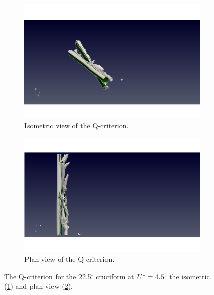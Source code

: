 \documentclass[oneside]{utmthesis}
\begin{document}
\begin{figure}[H]
  \centering
  \begin{subfigure}[h]{0.48\textwidth}
    \includegraphics[width=\textwidth,trim={1.5cm 0 3cm 0},clip]{figs/qIso225U02}
    \caption{Isometric view of the Q-criterion.}
    \label{fig:qIso225U02}
  \end{subfigure}
  \hfill
  \begin{subfigure}[h]{0.48\textwidth}
    \includegraphics[width=\textwidth,trim={1.5cm 0 3cm 0},clip]{figs/qTop225U02}
    \caption{Plan view of the Q-criterion.}
    \label{fig:qTop225U02}
  \end{subfigure}

  \caption{The Q-criterion for the 22.5$^{\circ}$ cruciform at $U^{*} = 4.5$: the isometric (\ref{fig:qIso225U02}) and plan view (\ref{fig:qTop225U02}).} \label{fig:qCrit225U02}
\end{figure}
\end{document}
